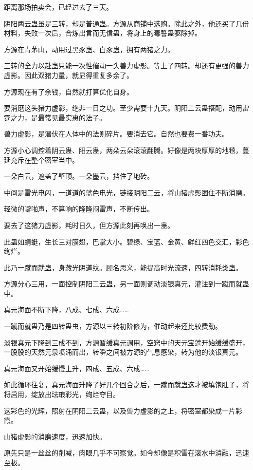 \begin{this_body}
距离那场拍卖会，已经过去了三天。

阴阳两云蛊虽是三转，却是普通蛊。方源从商铺中选购。除此之外，他还买了几份材料，失败一次后，合炼出言而无信蛊，将身上的毒誓蛊驱除掉。

方源在青茅山，动用过黑豕蛊、白豕蛊，拥有两猪之力。

三转的全力以赴蛊只能一次性催动一头兽力虚影。等上了四转。却还有更强的兽力虚影。因此双猪力量，就显得重复多余了。

方源现在有了余钱，自然就打算优化自身。

要消磨这头猪力虚影，绝非一日之功。至少需要十九天。阴阳二云蛊搭配，动用雷霆之力，是最常见最实惠的法子。

兽力虚影，是潜伏在人体中的法则碎片。要消去它。自然也要费一番功夫。

方源小心调控着阴云蛊、阳云蛊，两朵云朵滚滚翻腾。好像是两块厚厚的地毯，蔓延充斥在整个密室当中。

一朵白云，遮盖了壁顶。一朵墨云，挡住了地砖。

中间是雷光电闪，一道道的蓝色电光，链接阴阳二云，将山猪虚影困住不断消磨。

轻微的噼啪声，不算响的隆隆闷雷声，不断传出。

要去了这猪力虚影，耗时日久，但方源此刻再唤出一蛊。

此蛊如蜻蜓，生长三对膜翅，巴掌大小。碧绿、宝蓝、金黄、鲜红四色交汇，彩色绚烂。

此乃一蹴而就蛊，身藏光阴道纹。顾名思义，能提高时光流速，四转消耗类蛊。

方源分心三用，一面控制阴阳二云蛊，另一面则调动淡银真元，灌注到一蹴而就蛊中。

真元海面不断下降，八成、七成、六成……

一蹴而就蛊乃是四转蛊虫，方源以三转初阶修为，催动起来还比较费劲。

淡银真元下降到三成不到，方源暂缓真元调用，空窍中的天元宝莲开始缓缓盛开，一股股的天然元泉喷涌而出，转瞬之间被方源的气息感染，转为他的淡银真元。

真元海面又开始缓慢上升，四成、五成、六成……

如此循环往复，真元海面升降了好几个回合之后，一蹴而就蛊这才被填饱肚子，将将启用，绽放出珐琅彩光，绚烂夺目。

这彩色的光辉，照射在阴阳二云蛊，以及兽力虚影的之上，将密室都染成一片彩霞。

山猪虚影的消磨速度，迅速加快。

原先只是一丝丝的削减，肉眼几乎不可察觉。如今却像是积雪在滚水中消融，迅速至极。


\end{this_body}
